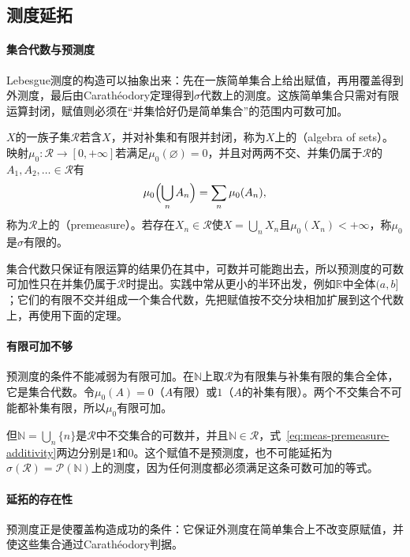 \subsection{测度延拓}
\label{sec:meas-extension}

\paragraph{集合代数与预测度}
Lebesgue测度的构造可以抽象出来：先在一族简单集合上给出赋值，再用覆盖得到外测度，最后由Carathéodory定理得到$\sigma$代数上的测度。这族简单集合只需对有限运算封闭，赋值则必须在“并集恰好仍是简单集合”的范围内可数可加。

\begin{definition}[集合代数与预测度]
\label{def:meas-algebra-premeasure}
$X$的一族子集$\mathcal R$若含$X$，并对补集和有限并封闭，称为$X$上的（algebra of sets）。映射$\mu_0:\mathcal R\to[0,+\infty]$若满足$\mu_0(\varnothing)=0$，并且对两两不交、并集仍属于$\mathcal R$的$A_1,A_2,\dots\in\mathcal R$有
\begin{equation}
 \mu_0\Bigl(\bigcup_nA_n\Bigr)=\sum_n\mu_0(A_n),
 \label{eq:meas-premeasure-additivity}
\end{equation}
称为$\mathcal R$上的（premeasure）。若存在$X_n\in\mathcal R$使$X=\bigcup_nX_n$且$\mu_0(X_n)<+\infty$，称$\mu_0$是$\sigma$有限的。
\end{definition}

集合代数只保证有限运算的结果仍在其中，可数并可能跑出去，所以预测度的可数可加性只在并集仍属于$\mathcal R$时提出。实践中常从更小的半环出发，例如$\mathbb R$中全体$(a,b]$；它们的有限不交并组成一个集合代数，先把赋值按不交分块相加扩展到这个代数上，再使用下面的定理。

\paragraph{有限可加不够}
预测度的条件不能减弱为有限可加。在$\mathbb N$上取$\mathcal R$为有限集与补集有限的集合全体，它是集合代数。令$\mu_0(A)=0$（$A$有限）或$1$（$A$的补集有限）。两个不交集合不可能都补集有限，所以$\mu_0$有限可加。

但$\mathbb N=\bigcup_n\{n\}$是$\mathcal R$中不交集合的可数并，并且$\mathbb N\in\mathcal R$，式~\eqref{eq:meas-premeasure-additivity}两边分别是$1$和$0$。这个赋值不是预测度，也不可能延拓为$\sigma(\mathcal R)=\mathcal P(\mathbb N)$上的测度，因为任何测度都必须满足这条可数可加的等式。

\paragraph{延拓的存在性}
预测度正是使覆盖构造成功的条件：它保证外测度在简单集合上不改变原赋值，并使这些集合通过Carathéodory判据。


